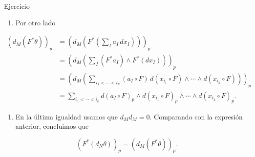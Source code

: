 \begin{bookproof}{Ejercicio}
\begin{enumerate}[start=8]
\item Por otro lado
\end{enumerate}
\[
\begin{aligned}(d_M(F^*\theta))_p&=\left(d_M\left(F^*\left(\sum_Ia_I\,dx_I\right)\right)\right)_p\\&=\left(d_M\left(\sum_I(F^*a_I)\wedge F^*(dx_I)\right)\right)_p\\&=\left(d_M\left(\sum_{i_1<\cdots<i_k}(a_I\circ F)\,d(x_{i_1}\circ F)\wedge\cdots\wedge d(x_{i_k}\circ F)\right)\right)_p\\&=\sum_{i_1<\cdots<i_k}d(a_I\circ F)_p\wedge d(x_{i_1}\circ F)_p\wedge\cdots\wedge d(x_{i_k}\circ F)_p.\end{aligned}
\]
\begin{enumerate}[start=9]
\item En la última igualdad usamos que $d_Md_M=0$. Comparando con la expresión anterior, concluimos que
\end{enumerate}
\[
(F^*(d_N\theta))_p=(d_M(F^*\theta))_p.
\]
\bookqed
\end{bookproof}
